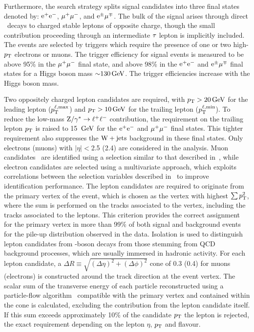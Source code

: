\documentclass[12pt,twoside,a4paper,cmspaper,final,collab]{cms-tdr}
\begin{document}
Furthermore, the search strategy splits signal candidates into
three final states denoted by: $\mathrm{e}^+\mathrm{e}^-$, ${\mu^+}{\mu^-}$, and
$\mathrm{e}^{\pm}{\mu}^{\mp}$.
The bulk of the signal arises through direct \PW\ decays to charged
stable leptons of opposite charge, though the small contribution
proceeding through an intermediate $\tau$ lepton is implicitly included.
The events are selected by triggers which require
the presence of one or two high-$p_{\mathrm{T}}$ electrons or muons.
The trigger efficiency for signal events is measured to be above 95\% in the ${\mu^+}{\mu^-}$
final state, and above 98\% in the $\mathrm{e}^+\mathrm{e}^-$ and $\mathrm{e}^{\pm}{\mu}^{\mp}$ final states for a
Higgs boson mass ${\sim}130\,\text{Ge\hspace{-.08em}V}$. The trigger efficiencies increase with the Higgs boson mass.

Two oppositely charged lepton candidates are required, with $p_{\mathrm{T}} >20\,\text{Ge\hspace{-.08em}V}$ for
the leading lepton ($p_{\mathrm{T}}^{\mathrm{\ell},\mathrm{max}}$) and $p_{\mathrm{T}} >10\,\text{Ge\hspace{-.08em}V}$ for the trailing lepton ($p_{\mathrm{T}}^{\mathrm{\ell},\mathrm{min}}$).
To reduce the low-mass $\mathrm{Z}/\gamma^*\to \ell^+\ell^-$ contribution, the requirement on the trailing lepton $p_{\mathrm{T}}$ is raised to 15 $\,\text{Ge\hspace{-.08em}V}$
for the $\mathrm{e}^+\mathrm{e}^-$ and ${\mu^+}{\mu^-}$ final states. This tighter requirement also
suppresses the $\mathrm{W}+\mathrm{jets}$ background in these final states. Only electrons (muons) with $|\eta| <$2.5 (2.4) are considered in the analysis.
Muon candidates~\cite{muonpas} are identified using a selection similar
to that described in~\cite{HWW2010}, while
electron candidates are selected using a multivariate
approach, which exploits correlations between the selection variables
described in~\cite{egmpas} to improve identification performance.
The lepton candidates are required to originate from the primary vertex of the
event, which is chosen as the vertex with highest $\sum p_{\mathrm{T}}^2$, where the sum
is performed on the tracks associated to the vertex, including
the tracks associated to the leptons.
This criterion provides the correct assignment for the
primary vertex in more than 99\% of both signal and
background events for the pile-up distribution observed in the data.
Isolation is used to distinguish lepton candidates from \PW-boson decays from those
stemming from QCD background processes, which are usually immersed in hadronic activity.
For each lepton candidate, a $\Delta R \equiv\sqrt{(\Delta\eta)^2 + (\Delta\phi)^2}$ cone
of 0.3 (0.4) for muons (electrons) is constructed around the track direction at the event vertex.
The scalar sum of the transverse energy of each
particle reconstructed using a particle-flow algorithm~\cite{PFT-09-001} compatible with the
primary vertex and contained within the cone is calculated,
excluding the contribution from the lepton candidate itself. If this
sum exceeds approximately 10\% of the candidate $p_{\mathrm{T}}$ the lepton is
rejected, the exact requirement depending on the lepton $\eta$, $p_{\mathrm{T}}$ and
flavour.
\end{document}
